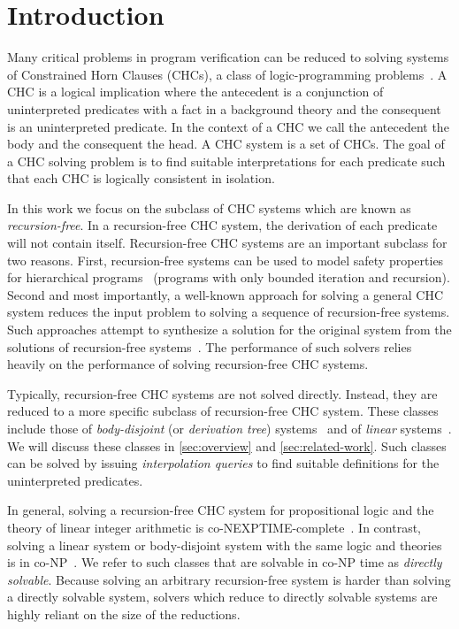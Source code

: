 \section{Introduction}
\label{sec:intro}
Many critical problems in program verification can be reduced to
solving systems of Constrained Horn Clauses (CHCs), a class of
logic-programming
problems~\cite{bjorner13,flanagan03,rummer13a,rummer13b}.
%
A CHC is a logical implication where the antecedent is a conjunction
of uninterpreted predicates with a fact in a background
theory and the consequent is an uninterpreted predicate.
%
In the context of a CHC we call the antecedent the body and the
consequent the head.  A CHC system is a set of CHCs. 
%
The goal of a CHC solving problem is to find suitable interpretations
for each predicate such that each CHC is logically
consistent in isolation.

In this work we focus on the subclass of CHC systems which are known
as \emph{recursion-free}. In a recursion-free CHC system, the
derivation of each predicate will not contain
itself.
%
Recursion-free CHC systems are an important subclass for two reasons.
%
First, recursion-free systems can be used to model safety properties
for hierarchical programs~\cite{lal-qadeer15,lal-qadeer-lahiri12}
(programs with only bounded iteration and recursion).
%
Second and most importantly, a well-known approach for solving a
general CHC system reduces the input problem to solving a sequence
of recursion-free systems.
%
Such approaches attempt to synthesize a solution for the   original
system from the solutions of recursion-free systems~\cite{bjorner13}.
%
The performance of such solvers relies
heavily on the performance of solving recursion-free CHC systems.
%

Typically, recursion-free CHC systems are not solved directly.
%
Instead, they are reduced to a more specific subclass of
recursion-free CHC system.
%
These classes include those of
\emph{body-disjoint} (or \emph{derivation tree})
systems~\cite{heizmann10,bjorner13,mcmillan14,rummer13a,rummer13b} and
of \emph{linear} systems~\cite{albarghouthi12a}.
%
We will discuss these classes in \autoref{sec:overview} and
\autoref{sec:related-work}.
%
Such classes can be solved by issuing
\emph{interpolation queries} to find suitable definitions for the
uninterpreted predicates.
%

In general, solving a recursion-free CHC system for
propositional logic and the theory of linear integer arithmetic is
co-NEXPTIME-complete~\cite{rummer13b}.
%
In contrast, solving a linear system or body-disjoint system with the
same logic and theories is in co-NP~\cite{rummer13b}.
%
We refer to such classes that are solvable in co-NP time as
\emph{directly solvable}.
%
Because solving an arbitrary recursion-free system is harder than
solving a directly solvable system, solvers which reduce to directly
solvable systems are highly reliant on the size of the reductions.

